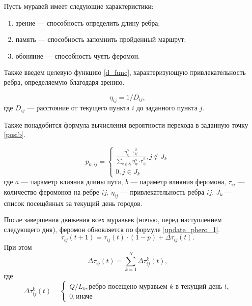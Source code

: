 Пусть муравей имеет следующие характеристики:
\begin{enumerate}[label=\arabic*.]
	\item зрение --- способность определить длину ребра;
	\item память --- способность запомнить пройденный маршрут;
	\item обоняние --- способность чуять феромон.
\end{enumerate}


Также введем целевую функцию \eqref{d_func}, характеризующую привлекательность ребра, определяемую благодаря зрению.

\begin{equation}
	\label{d_func}
	\eta_{ij} = 1 / D_{ij},
\end{equation}
где $D_{ij}$ — расстояние от текущего пункта $i$ до заданного пункта $j$.


Также понадобится формула вычисления вероятности перехода в заданную точку \eqref{posib}.

\begin{equation}
	\label{posib}
	p_{k,ij} = \begin{cases}
		\frac{\eta_{ij}^{\alpha}\cdot\tau_{ij}^{\beta}}{\sum_{q\notin J_k} \eta^\alpha_{iq}\cdot\tau^\beta_{iq}}, j \notin J_k \\
		0, j \in J_k
	\end{cases}
\end{equation}
где $a$ --- параметр влияния длины пути, $b$ --- параметр влияния феромона, $\tau_{ij}$ --- количество феромонов на ребре $ij$, $\eta_{ij}$ --- привлекательность ребра $ij$, $J_k$ --- список посещённых за текущий день городов.

После завершения движения всех муравьев (ночью, перед наступлением следующего дня), феромон обновляется по формуле \eqref{update_phero_1}.
\begin{equation}
	\label{update_phero_1}
	\tau_{ij}(t+1) = \tau_{ij}(t)\cdot(1-p) + \Delta \tau_{ij}(t).
\end{equation}
При этом
\begin{equation}
	\label{update_phero_2}
	\Delta \tau_{ij}(t) = \sum_{k=1}^N \Delta \tau^k_{ij}(t),
\end{equation}
где
\begin{equation}
	\label{update_phero_3}
	\Delta\tau^k_{ij}(t) = \begin{cases}
		Q/L_{k}, \textrm{ребро посещено муравьем $k$ в текущий день $t$,} \\
		0, \textrm{иначе}
	\end{cases}
\end{equation}

